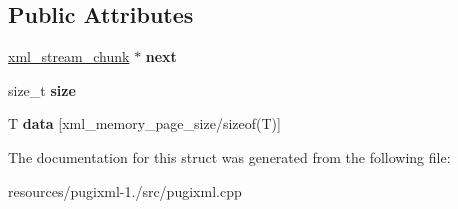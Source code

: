 \subsection*{Public Attributes}
\begin{DoxyCompactItemize}
\item 
\hypertarget{structxml__stream__chunk_ad00071f7340adb2bde7c4157d4100b3c}{\hyperlink{structxml__stream__chunk}{xml\+\_\+stream\+\_\+chunk} $\ast$ {\bfseries next}}\label{structxml__stream__chunk_ad00071f7340adb2bde7c4157d4100b3c}

\item 
\hypertarget{structxml__stream__chunk_a42618ba3b7bda1246cfc640149fc34eb}{size\+\_\+t {\bfseries size}}\label{structxml__stream__chunk_a42618ba3b7bda1246cfc640149fc34eb}

\item 
\hypertarget{structxml__stream__chunk_a365e2e228a0277467b25a0fea42b8518}{T {\bfseries data} \mbox{[}xml\+\_\+memory\+\_\+page\+\_\+size/sizeof(T)\mbox{]}}\label{structxml__stream__chunk_a365e2e228a0277467b25a0fea42b8518}

\end{DoxyCompactItemize}


The documentation for this struct was generated from the following file\+:\begin{DoxyCompactItemize}
\item 
resources/pugixml-\/1./src/pugixml.\+cpp\end{DoxyCompactItemize}
